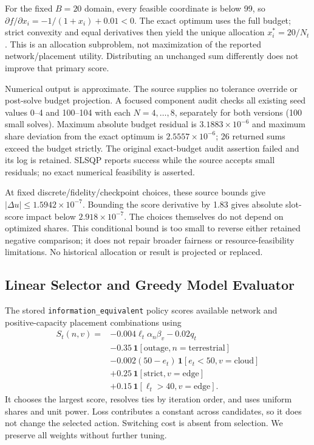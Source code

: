 \documentclass[10pt,twocolumn]{article}
\newcommand{\pol}[1]{\texttt{#1}}
\begin{document}
For the fixed $B=20$ domain, every feasible coordinate is below 99, so $\partial f/\partial x_i=-1/(1+x_i)+0.01<0$. The exact optimum uses the full budget; strict convexity and equal derivatives then yield the unique allocation $x_i^*=20/N_t$. This is an allocation subproblem, not maximization of the reported network/placement utility. Distributing an unchanged sum differently does not improve that primary score.

Numerical output is approximate. The source supplies no tolerance override or post-solve budget projection. A focused component audit checks all existing seed values 0--4 and 100--104 with each $N=4,\ldots,8$, separately for both versions (100 small solves). Maximum absolute budget residual is $3.1883\times10^{-6}$ and maximum share deviation from the exact optimum is $2.5557\times10^{-6}$; 26 returned sums exceed the budget strictly. The original exact-budget audit assertion failed and its log is retained. SLSQP reports success while the source accepts small residuals; no exact numerical feasibility is asserted.

At fixed discrete/fidelity/checkpoint choices, these source bounds give $|\Delta u|\le1.5942\times10^{-7}$. Bounding the score derivative by 1.83 gives absolute slot-score impact below $2.918\times10^{-7}$. The choices themselves do not depend on optimized shares. This conditional bound is too small to reverse either retained negative comparison; it does not repair broader fairness or resource-feasibility limitations. No historical allocation or result is projected or replaced.

\subsection{Linear Selector and Greedy Model Evaluator}
The stored \pol{information\_equivalent} policy scores available network and positive-capacity placement combinations using
\begin{align}
S_t(n,v)={}&-0.004\ell_t\alpha_n\beta_v-0.02q_t\\
&-0.35\,\mathbf{1}[\text{outage},n=\text{terrestrial}]\nonumber\\
&-0.002(50-e_t)\,\mathbf{1}[e_t<50,v=\text{cloud}]\nonumber\\
&+0.25\,\mathbf{1}[\text{strict},v=\text{edge}]\nonumber\\
&+0.15\,\mathbf{1}[\ell_t>40,v=\text{edge}].\nonumber
\end{align}
It chooses the largest score, resolves ties by iteration order, and uses uniform shares and unit power. Loss contributes a constant across candidates, so it does not change the selected action. Switching cost is absent from selection. We preserve all weights without further tuning.
\end{document}
